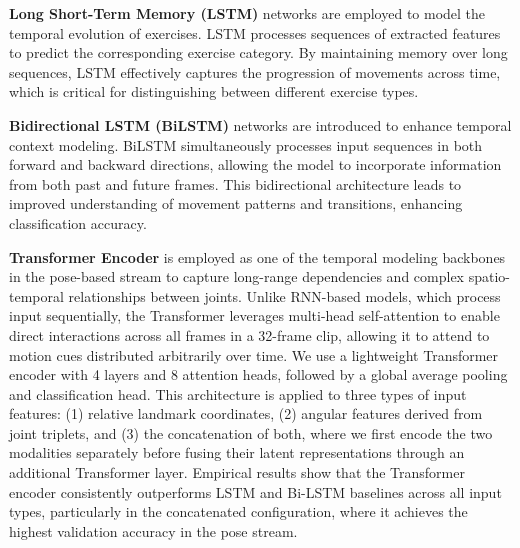 \documentclass[journal,onecolumn, 11pt]{IEEEtran}
\begin{document}
\textbf{Long Short-Term Memory (LSTM)} networks are employed to model the temporal evolution of exercises. LSTM processes sequences of extracted features to predict the corresponding exercise category. By maintaining memory over long sequences, LSTM effectively captures the progression of movements across time, which is critical for distinguishing between different exercise types.	\cite{hochreiter1997long}

\textbf{Bidirectional LSTM (BiLSTM)} networks are introduced to enhance temporal context modeling. BiLSTM simultaneously processes input sequences in both forward and backward directions, allowing the model to incorporate information from both past and future frames. This bidirectional architecture leads to improved understanding of movement patterns and transitions, enhancing classification accuracy.	\cite{graves2005}

\textbf{Transformer Encoder} is employed as one of the temporal modeling backbones in the pose-based stream to capture long-range dependencies and complex spatio-temporal relationships between joints. Unlike RNN-based models, which process input sequentially, the Transformer leverages multi-head self-attention to enable direct interactions across all frames in a 32-frame clip, allowing it to attend to motion cues distributed arbitrarily over time. We use a lightweight Transformer encoder with 4 layers and 8 attention heads, followed by a global average pooling and classification head. This architecture is applied to three types of input features: (1) relative landmark coordinates, (2) angular features derived from joint triplets, and (3) the concatenation of both, where we first encode the two modalities separately before fusing their latent representations through an additional Transformer layer. Empirical results show that the Transformer encoder consistently outperforms LSTM and Bi-LSTM baselines across all input types, particularly in the concatenated configuration, where it achieves the highest validation accuracy in the pose stream.\cite{plizzari2021sttr}

\end{document}
